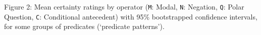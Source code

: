 \documentclass[12pt, letterpaper]{article}
\begin{document}
{\vspace{-.4\baselineskip}
\noindent \normalsize Figure 2: \small Mean certainty ratings by operator (\texttt{M}: Modal, \texttt{N}: Negation, \texttt{Q}: Polar Question, \texttt{C}: Conditional antecedent) with 95\% bootstrapped confidence intervals, for some groups of predicates (\lq predicate patterns\rq).

	

\newpage


}
\end{document}
